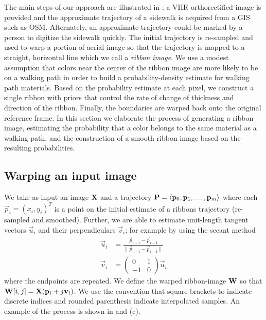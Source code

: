 The main steps of our approach are illustrated in ; a \ac{VHR} orthorectified image is provided and  the approximate trajectory of a sidewalk is acquired from a \ac{GIS} such as \ac{OSM}. Alternately, an approximate trajectory could be marked by a person to digitize the sidewalk quickly. The initial trajectory is re-sampled and used to warp a portion of aerial image so that the trajectory is mapped to a straight, horizontal line which we call a \textit{ribbon image}.  We use a modest assumption that colors near the center of the ribbon image are more likely to be on a walking path in order to build a probability-density estimate for walking path materials. Based on the probability estimate at each pixel, we construct a single ribbon with priors that control the rate of change of thickness and direction of the ribbon. Finally, the boundaries are warped back onto the original reference frame. In this section we elaborate the process of generating a ribbon image, estimating the probability that a color belongs to the same material as a walking path, and the construction of a smooth ribbon image based on the resulting probabilities. 



\subsection{Warping an input image}

We take as input an image $\mathbf{X}{}$ and a trajectory $\mathbf{P}{}=\langle \mathbf{p}_0, \mathbf{p}_1,\dots,\mathbf{p}_m\rangle$ where each $\vec{p}_i=(x_i, y_i)^T$ is a point on the initial estimate of a ribbons trajectory (re-sampled and smoothed). Further, we are able to estimate unit-length tangent vectors $\vec{u}_i$ and their perpendiculars $\vec{v}_i$; for example by using the secant method 
\begin{align}
  \vec{u}_i &= \frac{\vec{p}_{i+1}-\vec{p}_{i-1}}{\|\vec{p}_{i+1}-\vec{p}_{i-1}\|} \\
  \vec{v}_i &= \left(\begin{array}{cc}
       0  & 1 \\
       -1 & 0
  \end{array} \right) \vec{u}_i
\end{align}
where the endpoints are repeated. We define the warped ribbon-image $\mathbf{W}{}$ so that $\mathbf{W}{[i,j]}=\mathbf{X}{}(\mathbf{p}_i+ j \mathbf{v}_i)$. We use the convention that square-brackets to indicate discrete indices and rounded parenthesis indicate interpolated samples.  An example of the process is shown in  and (c). 

